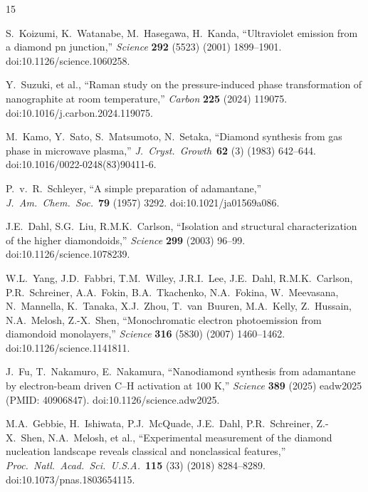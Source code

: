 \documentclass[10pt,twocolumn,a4paper]{article}
\begin{document}
\begin{thebibliography}{15}
\footnotesize

S.~Koizumi, K.~Watanabe, M.~Hasegawa, H.~Kanda, ``Ultraviolet emission from a diamond pn junction,'' \textit{Science} \textbf{292} (5523) (2001) 1899--1901. doi:10.1126/science.1060258.

Y.~Suzuki, et al., ``Raman study on the pressure-induced phase transformation of nanographite at room temperature,'' \textit{Carbon} \textbf{225} (2024) 119075. doi:10.1016/j.carbon.2024.119075.

M.~Kamo, Y.~Sato, S.~Matsumoto, N.~Setaka, ``Diamond synthesis from gas phase in microwave plasma,'' \textit{J.\ Cryst.\ Growth}\ \textbf{62} (3) (1983) 642--644. doi:10.1016/0022-0248(83)90411-6.

P.~v.~R.~Schleyer, ``A simple preparation of adamantane,'' \textit{J.\ Am.\ Chem.\ Soc.}\ \textbf{79} (1957) 3292. doi:10.1021/ja01569a086.

J.E.~Dahl, S.G.~Liu, R.M.K.~Carlson, ``Isolation and structural characterization of the higher diamondoids,'' \textit{Science} \textbf{299} (2003) 96--99. doi:10.1126/science.1078239.

W.L.~Yang, J.D.~Fabbri, T.M.~Willey, J.R.I.~Lee, J.E.~Dahl, R.M.K.~Carlson, P.R.~Schreiner, A.A.~Fokin, B.A.~Tkachenko, N.A.~Fokina, W.~Meevasana, N.~Mannella, K.~Tanaka, X.J.~Zhou, T.~van~Buuren, M.A.~Kelly, Z.~Hussain, N.A.~Melosh, Z.-X.~Shen, ``Monochromatic electron photoemission from diamondoid monolayers,'' \textit{Science} \textbf{316} (5830) (2007) 1460--1462. doi:10.1126/science.1141811.

J.~Fu, T.~Nakamuro, E.~Nakamura, ``Nanodiamond synthesis from adamantane by electron-beam driven C--H activation at 100 K,'' \textit{Science} \textbf{389} (2025) eadw2025 (PMID: 40906847). doi:10.1126/science.adw2025.

M.A.~Gebbie, H.~Ishiwata, P.J.~McQuade, J.E.~Dahl, P.R.~Schreiner, Z.-X.~Shen, N.A.~Melosh, et al., ``Experimental measurement of the diamond nucleation landscape reveals classical and nonclassical features,'' \textit{Proc.\ Natl.\ Acad.\ Sci.\ U.S.A.}\ \textbf{115} (33) (2018) 8284--8289. doi:10.1073/pnas.1803654115.


\end{thebibliography}
\end{document}
